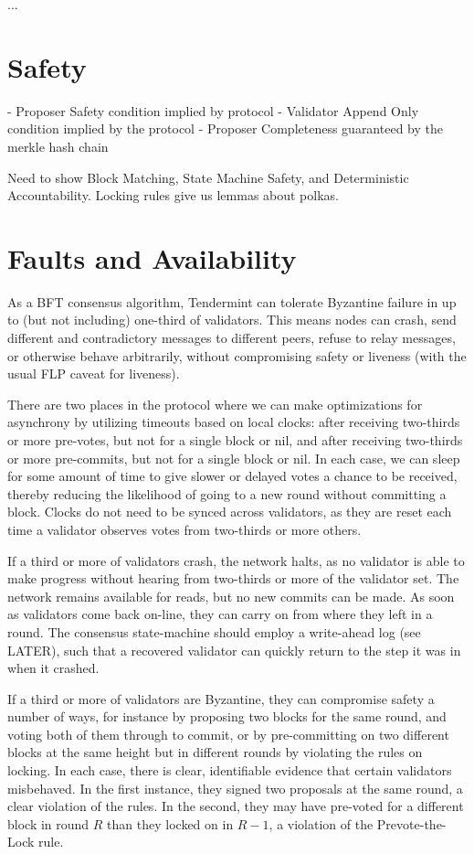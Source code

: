 ...

\section{Safety}

- Proposer Safety condition implied by protocol
- Validator Append Only condition implied by the protocol
- Proposer Completeness guaranteed by the merkle hash chain

Need to show Block Matching, State Machine Safety, and Deterministic Accountability.
Locking rules give us lemmas about polkas.





\section{Faults and Availability}

As a BFT consensus algorithm, Tendermint can tolerate Byzantine failure in up to (but not including) one-third of validators.
This means nodes can crash, send different and contradictory messages to different peers, refuse to relay messages, or otherwise behave arbitrarily,
without compromising safety or liveness (with the usual FLP caveat for liveness).

There are two places in the protocol where we can make optimizations for asynchrony by utilizing timeouts based on local clocks:
after receiving two-thirds or more pre-votes, but not for a single block or nil, and after receiving two-thirds or more pre-commits, 
but not for a single block or nil.
In each case, we can sleep for some amount of time to give slower or delayed votes a chance to be received,
thereby reducing the likelihood of going to a new round without committing a block.
Clocks do not need to be synced across validators, as they are reset each time a validator observes votes from two-thirds or more others.

If a third or more of validators crash, the network halts, 
as no validator is able to make progress without hearing from two-thirds or more of the validator set.
The network remains available for reads, but no new commits can be made.
As soon as validators come back on-line, they can carry on from where they left in a round. 
The consensus state-machine should employ a write-ahead log (see LATER),
such that a recovered validator can quickly return to the step it was in when it crashed.

If a third or more of validators are Byzantine, they can compromise safety a number of ways, 
for instance by proposing two blocks for the same round, and voting both of them through to commit, 
or by pre-committing on two different blocks at the same height but in different rounds by violating the rules on locking.
In each case, there is clear, identifiable evidence that certain validators misbehaved. 
In the first instance, they signed two proposals at the same round, a clear violation of the rules.
In the second, they may have pre-voted for a different block in round $R$ than they locked on in $R-1$, 
a violation of the Prevote-the-Lock rule.

